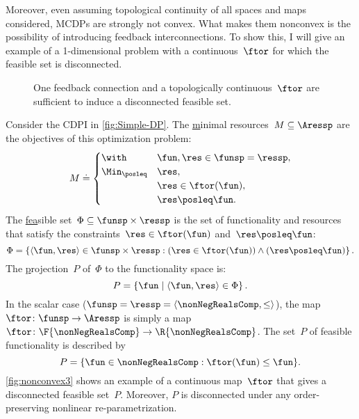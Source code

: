 Moreover, even assuming topological continuity of all spaces and maps
considered, MCDPs are strongly not convex. What makes them nonconvex
is the possibility of introducing feedback interconnections. To show
this, I will give an example of a 1-dimensional problem with a continuous~$\ftor$
for which the feasible set is disconnected.

\begin{figure}[h]
    \hfill
    \hfill
    \hfill
    \caption{One feedback connection and a topologically continuous~$\ftor$
        are sufficient to induce a disconnected feasible set.}
    \label{fig:ceil-1}
\end{figure}

\medskip{}

\begin{example}
    \label{exa:one}
    Consider the CDPI in \cref{fig:Simple-DP}. The \uline{m}inimal resources~$M\subseteq\Aressp$ are the objectives of this optimization problem:
    \[
        M\doteq\begin{cases}
                   \with & \fun,\res\in\funsp=\ressp,\\
                   \Min_{\posleq} & \res,\\
                   & \res\in\ftor(\fun),\\
                   & \res\posleq\fun.
        \end{cases}
    \]
    The \uline{fea}sible set~$\Phi\subseteq\funsp\times\ressp$ is
    the set of functionality and resources that satisfy the constraints~$\res\in\ftor(\fun)$
    and~$\res\posleq\fun$:
    \begin{equation}
        \Phi=\left\{ \langle\fun,\res\rangle\in\funsp\times\ressp:(\res\in\ftor(\fun))\wedge(\res\posleq\fun)\right\} .\label{eq:feasible}
    \end{equation}
    The \uline{p}rojection~$P$ of~$\Phi$ to the functionality space
    is:
    \[
        P=\left\{ \fun\mid\left\langle \fun,\res\right\rangle \in\Phi\right\}.
    \]
    In the scalar case ($\funsp=\ressp=\langle\nonNegRealsComp,\leq\rangle$),
    the map~$\ftor\colon\funsp\rightarrow\Aressp$ is simply a map~$\ftor\colon\F{\nonNegRealsComp}\rightarrow\R{\nonNegRealsComp}$.
    The set~$P$ of feasible functionality is described by
    \begin{equation}
        P=\{\fun\in\nonNegRealsComp:\ftor(\fun)\leq\fun\}.\label{eq:Pfeasible}
    \end{equation}
    \cref{fig:nonconvex3} shows an example of a continuous map~$\ftor$
    that gives a disconnected feasible set~$P$. Moreover, $P$ is disconnected
    under any order-preserving nonlinear re-parametrization.

\end{example}

